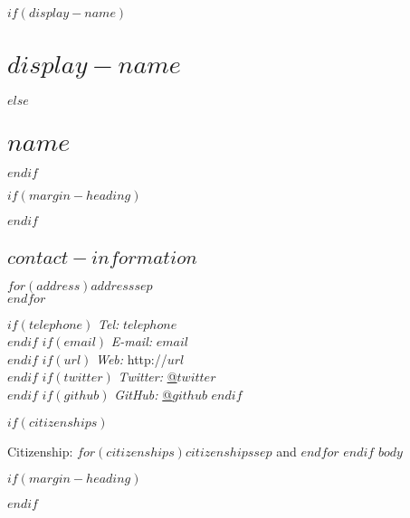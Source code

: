 \documentclass[%
  $if(papersize)$
    $papersize$paper,
  $endif$
  $typesize$,
  oneside
  ]{memoir}
\let\oldsection\section
\renewcommand{\section}[1]{%
  \oldsection{#1}
  \leavevmode
  \par
  \vspace{\dimexpr-\baselineskip-\parskip}
}
\begin{document}
  $if(display-name)$
    \chapter*{$display-name$}
  $else$
    \chapter*{$name$}
  $endif$

$if(margin-heading)$
  \begin{adjustwidth*}{9em}{0em}
  \mbox{}
$endif$

  \hypertarget{contact-information}{%
  \section{$contact-information$}\label{contact-information}}
    \begin{minipage}[t]{0.3\textwidth}
      $for(address)$$address$$sep$\\ $endfor$
    \end{minipage}
    \begin{minipage}[t]{0.7\textwidth}
        $if(telephone)$
        {\textit{Tel:}} $telephone$ \\
        $endif$
        $if(email)$
        {\textit{E-mail:}} $email$ \\
        $endif$
        $if(url)$
        {\textit{Web:}} http://$url$ \\
        $endif$
        $if(twitter)$
        {\textit{Twitter:}} \href{http://twitter.com/$twitter$}{@$twitter$} \\
        $endif$
        $if(github)$
        {\textit{GitHub:}} \href{http://github.com/$github$}{@$github$}
        $endif$
    \end{minipage}
  $if(citizenships)$
    \medskip%
    \par Citizenship:
    $for(citizenships)$$citizenships$$sep$ and $endfor$
  $endif$
$body$

$if(margin-heading)$
  \end{adjustwidth*}
$endif$
\end{document}
